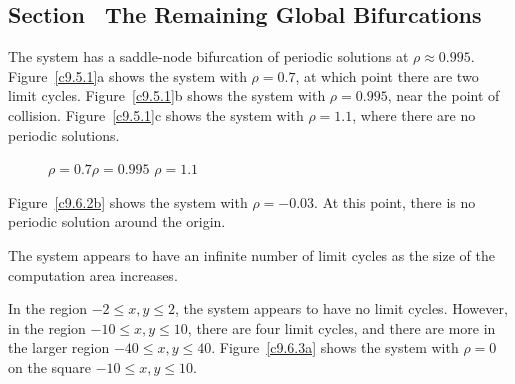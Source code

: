 \begin{figure}[htb]
                       \centerline{%
                       }
\end{figure}



\subsection*{Section~\protect{\ref{S:GlobalBif}} The Remaining Global Bifurcations}

The system has a saddle-node bifurcation of periodic solutions
at $\rho \approx 0.995$.  Figure~\ref{c9.5.1}a shows the system
with $\rho = 0.7$, at which point there are two limit cycles. 
Figure~\ref{c9.5.1}b shows the system with $\rho = 0.995$, near the point
of collision.  Figure~\ref{c9.5.1}c shows the system with $\rho = 1.1$, where
there are no periodic solutions.

\begin{figure}[htb]
                       \centerline{%
                       }
		\centerline{$\rho = 0.7$\hspace{1.3in}$\rho = 0.995$
\hspace{1.3in}$\rho = 1.1$}
\end{figure}

\newpage
{} Figure~\ref{c9.6.2b} shows the system with $\rho = -0.03$. 
At this point, there is no periodic solution around the origin.

\begin{figure}[htb]
                       \centerline{%
                       }
\end{figure}

\ans The system appears to have an infinite number of limit cycles
as the size of the computation area increases.

\soln In the region $-2 \leq x,y \leq 2$, the system appears to have no
limit cycles.  However, in the region $-10 \leq x,y \leq 10$, there are
four limit cycles, and there are more in the larger region $-40 \leq x,y
\leq 40$.  Figure~\ref{c9.6.3a} shows the system with $\rho = 0$ on the
square $-10 \leq x,y \leq 10$.

